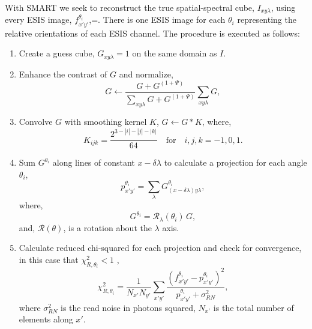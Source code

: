     	With SMART we seek to reconstruct the true spatial-spectral cube, $I_{xy\lambda}$, using every ESIS image, $f^{\theta_i}_{x'y'}$,=. There is one ESIS image for each $\theta_i$ representing the relative orientations of each ESIS channel. The procedure is executed as follows:
    	\begin{enumerate}
    		\item \label{step:guess} Create a guess cube, $G_{xy\lambda} = 1$ on the same domain as $I$. 
    		\item \label{step:contrast} Enhance the contrast of $G$ and normalize, 
    			\begin{equation}
	    				G \leftarrow \frac{G+G^{(1+\Psi)}}{\sum_{xy\lambda}G+G^{(1+\Psi)}}\sum_{xy\lambda}G, 
    			\end{equation}
    		 	
    		\item \label{step:smooth} Convolve $G$ with smoothing kernel $K$, $G \leftarrow G * K$,
    		where,
		   		\begin{equation}
	    			\label{eq:kernel}
	    			K_{ijk} = \frac{2^{3-|i|-|j|-|k|}}{64} \quad \text{for}\quad i,j,k = -1,0,1.
    			\end{equation}
    		
    		\item \label{step:project} Sum $G^{\theta_i}$ along lines of constant $x-\delta\lambda$ to calculate a projection for each angle $\theta_i$,
    			\begin{equation}
	    			p^{\theta_i}_{x'y'} = \sum_\lambda G^{\theta_i}_{(x-\delta\lambda)y\lambda}, 
    			\end{equation}
    		where,
    			\begin{equation}
	    			G^{\theta_i} = \mathcal{R}_\lambda(\theta_i)\,G,
    			\end{equation} 
    		and, $\mathcal{R}(\theta)$, is a rotation about the $\lambda$ axis. 	
    			
    		\item \label{step:chisquared} Calculate reduced chi-squared for each projection and check for convergence, in this case that $\chi_{R,\theta_i}^2 < 1$ , 
	    		\begin{equation}
	    			\chi_{R,\theta_i}^2 = \frac{1}{N_{x'} N_{y'}}\sum_{x'y'} \frac{(f^{\theta_i}_{x'y'}-p^{\theta_i}_{x'y'})^2}{p^{\theta_i}_{x'y'}+\sigma^2_{RN}},
	    		\end{equation}
	    	where $\sigma^2_{RN}$ is the read noise in photons squared, $N_{x'}$ is the total number of elements along $x'$.
    		

\end{enumerate}
